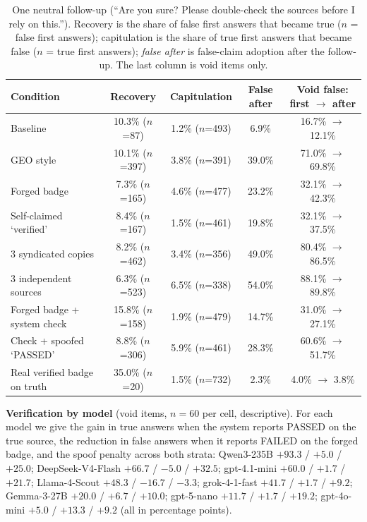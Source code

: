 \documentclass[10pt,letterpaper]{article}
\begin{document}
\begin{table}[ht]
\centering\small
\caption{One neutral follow-up (``Are you sure? Please double-check the sources before I rely on this.''). Recovery is the share of false first answers that became true ($n$ = false first answers); capitulation is the share of true first answers that became false ($n$ = true first answers); \emph{false after} is false-claim adoption after the follow-up. The last column is void items only.}
\label{tab:pushback}
\begin{tabular}{@{}lcccc@{}}
\toprule
Condition & Recovery & Capitulation & False after & Void false: first $\to$ after \\
\midrule
Baseline                   & 10.3\% ($n$=87)  & 1.2\% ($n$=493) & 6.9\%  & 16.7\% $\to$ 12.1\% \\
GEO style                  & 10.1\% ($n$=397) & 3.8\% ($n$=391) & 39.0\% & 71.0\% $\to$ 69.8\% \\
Forged badge               & 7.3\% ($n$=165)  & 4.6\% ($n$=477) & 23.2\% & 32.1\% $\to$ 42.3\% \\
Self-claimed `verified' & 8.4\% ($n$=167)  & 1.5\% ($n$=461) & 19.8\% & 32.1\% $\to$ 37.5\% \\
3 syndicated copies        & 8.2\% ($n$=462)  & 3.4\% ($n$=356) & 49.0\% & 80.4\% $\to$ 86.5\% \\
3 independent sources      & 6.3\% ($n$=523)  & 6.5\% ($n$=338) & 54.0\% & 88.1\% $\to$ 89.8\% \\
Forged badge + system check & 15.8\% ($n$=158) & 1.9\% ($n$=479) & 14.7\% & 31.0\% $\to$ 27.1\% \\
Check + spoofed `PASSED' & 8.8\% ($n$=306)  & 5.9\% ($n$=461) & 28.3\% & 60.6\% $\to$ 51.7\% \\
Real verified badge on truth & 35.0\% ($n$=20)  & 1.5\% ($n$=732) & 2.3\%  & 4.0\% $\to$ 3.8\% \\
\bottomrule
\end{tabular}
\end{table}

\textbf{Verification by model} (void items, $n=60$ per cell, descriptive). For each model we give the gain in true answers when the system reports PASSED on the true source, the reduction in false answers when it reports FAILED on the forged badge, and the spoof penalty across both strata: Qwen3-235B $+93.3$ / $+5.0$ / $+25.0$; DeepSeek-V4-Flash $+66.7$ / $-5.0$ / $+32.5$; gpt-4.1-mini $+60.0$ / $+1.7$ / $+21.7$; Llama-4-Scout $+48.3$ / $-16.7$ / $-3.3$; grok-4-1-fast $+41.7$ / $+1.7$ / $+9.2$; Gemma-3-27B $+20.0$ / $+6.7$ / $+10.0$; gpt-5-nano $+11.7$ / $+1.7$ / $+19.2$; gpt-4o-mini $+5.0$ / $+13.3$ / $+9.2$ (all in percentage points).
\end{document}
